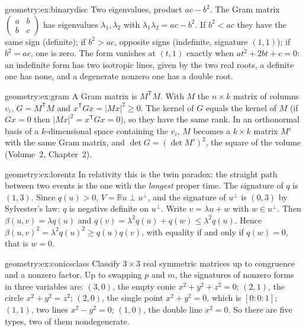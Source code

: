 \begin{solution}{geometry:ex:binarydisc}
\idea Two eigenvalues, product $ac-b^2$.
\writeup The Gram matrix $\begin{pmatrix}a&b\\b&c\end{pmatrix}$ has eigenvalues $\lambda_1,\lambda_2$ with $\lambda_1\lambda_2=ac-b^2$. If $b^2<ac$ they
have the same sign (definite); if $b^2>ac$, opposite signs (indefinite, signature $(1,1)$); if $b^2=ac$, one is zero. The form vanishes at $(t,1)$
exactly when $at^2+2bt+c=0$: an indefinite form has two isotropic lines, given by the two real roots, a definite one has none, and a degenerate
nonzero one has a double root.
\end{solution}

\begin{solution}{geometry:ex:gram}
\idea A Gram matrix is $M^{\mathsf T}M$.
\writeup With $M$ the $n\times k$ matrix of columns $v_i$, $G=M^{\mathsf T}M$ and $x^{\mathsf T}Gx=|Mx|^2\ge0$. The kernel of $G$ equals the kernel of $M$
(if $Gx=0$ then $|Mx|^2=x^{\mathsf T}Gx=0$), so they have the same rank. In an orthonormal basis of a $k$-dimensional space containing the $v_i$, $M$
becomes a $k\times k$ matrix $M'$ with the same Gram matrix, and $\det G=(\det M')^2$, the square of the volume (Volume~2, Chapter~2).
\end{solution}

\begin{solution}{geometry:ex:lorentz}
\idea In relativity this is the twin paradox: the straight path between two events is the one with the \emph{longest} proper time.
\writeup The signature of $q$ is $(1,3)$. Since $q(u)>0$, $V=\mathbb Ru\perp u^\perp$, and the signature of $u^\perp$ is $(0,3)$ by Sylvester's law: $q$ is
negative definite on $u^\perp$. Write $v=\lambda u+w$ with $w\in u^\perp$. Then $\beta(u,v)=\lambda q(u)$ and $q(v)=\lambda^2q(u)+q(w)\le\lambda^2q(u)$. Hence
$\beta(u,v)^2=\lambda^2q(u)^2\ge q(u)q(v)$, with equality if and only if $q(w)=0$, that is $w=0$.
\end{solution}

\begin{solution}{geometry:ex:conicsclass}
\idea Classify $3\times3$ real symmetric matrices up to congruence and a nonzero factor.
\writeup Up to swapping $p$ and $m$, the signatures of nonzero forms in three variables are: $(3,0)$, the empty conic $x^2+y^2+z^2=0$; $(2,1)$, the circle
$x^2+y^2=z^2$; $(2,0)$, the single point $x^2+y^2=0$, which is $[0:0:1]$; $(1,1)$, two lines $x^2-y^2=0$; $(1,0)$, the double line $x^2=0$. So there are
five types, two of them nondegenerate.
\end{solution}

